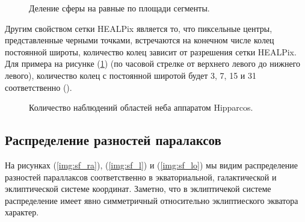 \documentclass[14pt]{article} %
\begin{document}
\begin{figure}[h!]
\caption{Деление сферы на равные по площади сегменты.}
\label{img:healpix}
\end{figure}

Другим свойством сетки HEALPix является то, что пиксельные центры, представленные черными точками, встречаются на конечном числе колец постоянной широты, количество колец зависит от разрешения сетки HEALPix. Для примера на рисунке (\ref{img:healpix}) (по часовой стрелке от верхнего левого до нижнего левого), количество колец с постоянной широтой будет 3, 7, 15 и 31 соответственно (\cite{wiki:healpix}).

\begin{figure}[h!]
\caption{Количество наблюдений областей неба аппаратом Hipparcos.}
\label{img:nobs}
\end{figure}


\subsection{Распределение разностей паралаксов}\label{sub:smthhealpix}

На рисунках (\ref{img:sf_ra}), (\ref{img:sf_l}) и (\ref{img:sf_lo}) мы видим распределение разностей параллаксов соответственно в экваториальной, галактической и эклиптической системе координат. Заметно, что в эклиптичекой системе распределение имеет явно симметричный относительно эклиптиеского экватора характер.
\end{document}

